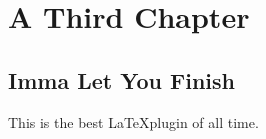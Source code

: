 
\chapter{A Third Chapter}
\section{Imma Let You Finish}
This is the best \LaTeX plugin of all time.
